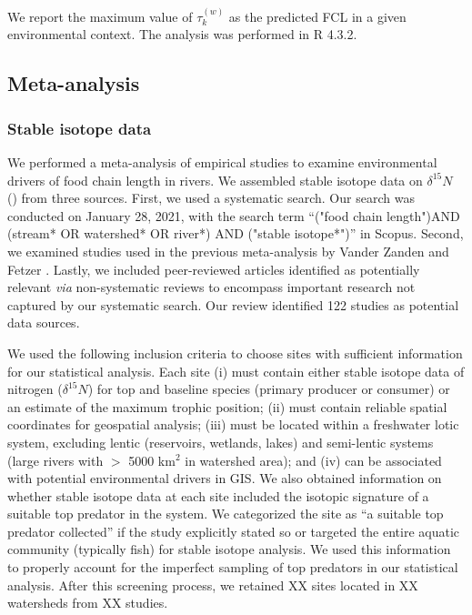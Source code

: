 \documentclass[11pt, class=article, crop=false]{standalone}
\begin{document}
We report the maximum value of $\tau_k^{(w)}$ as the predicted FCL in a given environmental context.
The analysis was performed in R 4.3.2.

\subsection{Meta-analysis}

\subsubsection{Stable isotope data}

We performed a meta-analysis of empirical studies to examine environmental drivers of food chain length in rivers.
We assembled stable isotope data on $\delta^{15} N$ (\textperthousand) from three sources.
First, we used a systematic search. 
Our search was conducted on January 28, 2021, with the search term ``("food chain length")AND (stream* OR watershed* OR river*) AND ("stable isotope*")'' in Scopus.
Second, we examined studies used in the previous meta-analysis by Vander Zanden and Fetzer \citep{vander_zanden_global_2007}.
Lastly, we included peer-reviewed articles identified as potentially relevant \textit{via} non-systematic reviews to encompass important research not captured by our systematic search.
Our review identified 122 studies as potential data sources.

We used the following inclusion criteria to choose sites with sufficient information for our statistical analysis.
Each site (i) must contain either stable isotope data of nitrogen ($\delta^{15}N$) for top and baseline species (primary producer or consumer) or an estimate of the maximum trophic position; 
(ii) must contain reliable spatial coordinates for geospatial analysis; 
(iii) must be located within a freshwater lotic system, excluding lentic (reservoirs, wetlands, lakes) and semi-lentic systems (large rivers with $>$ 5000 km$^2$ in watershed area); and (iv) can be associated with potential environmental drivers in GIS.
We also obtained information on whether stable isotope data at each site included the isotopic signature of a suitable top predator in the system.
We categorized the site as ``a suitable top predator collected'' if the study explicitly stated so or targeted the entire aquatic community (typically fish) for stable isotope analysis.
We used this information to properly account for the imperfect sampling of top predators in our statistical analysis.
After this screening process, we retained XX sites located in XX watersheds from XX studies. 
\end{document}

